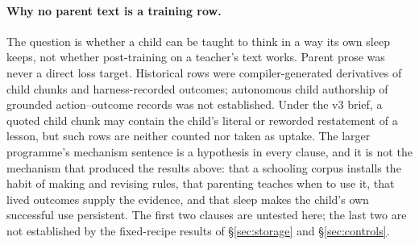 \documentclass{article}
\begin{document}
\paragraph{Why no parent text is a training row.} The question is whether a child can be taught to think in a way its own sleep keeps, not whether post-training on a teacher's text works. Parent prose was never a direct loss target. Historical rows were compiler-generated derivatives of child chunks and harness-recorded outcomes; autonomous child authorship of grounded action--outcome records was not established. Under the v3 brief, a quoted child chunk may contain the child's literal or reworded restatement of a lesson, but such rows are neither counted nor taken as uptake. The larger programme's mechanism sentence is a hypothesis in every clause, and it is not the mechanism that produced the results above: that a schooling corpus installs the habit of making and revising rules, that parenting teaches when to use it, that lived outcomes supply the evidence, and that sleep makes the child's own successful use persistent. The first two clauses are untested here; the last two are not established by the fixed-recipe results of \S\ref{sec:storage} and \S\ref{sec:controls}.

\end{document}
